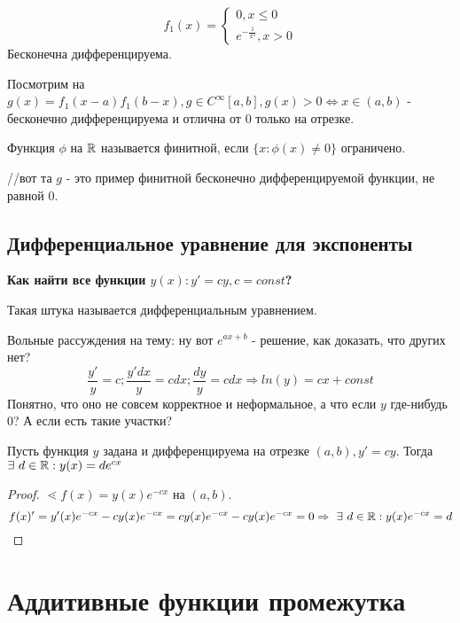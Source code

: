 \documentclass[12pt]{report}
\begin{document}
\begin{ex}[2]
$$f_1(x) = \left\{
\begin{matrix}
0, x \le 0\\
e^{-\frac{1}{x^2}}, x > 0
\end{matrix}\right.
$$
Бесконечна дифференцируема.

Посмотрим на $g(x) = f_1(x - a)f_1(b - x), g \in C^\infty[a, b], g(x) > 0 \Leftrightarrow x \in (a, b)$ - бесконечно дифференцируема и отлична от $0$ только на отрезке.
\end{ex}

\begin{defn}
Функция $\phi$ на $\mathbb{R}$ называется финитной, если $\{x: \phi(x) \neq 0\}$ ограничено.

//вот та $g$ - это пример финитной бесконечно дифференцируемой функции, не равной $0$.
\end{defn}

\section{Дифференциальное уравнение для экспоненты}

{\bfseries Как найти все функции $y(x): y' = cy, c = const$?}

Такая штука называется дифференциальным уравнением.

\begin{rem}
Вольные рассуждения на тему: ну вот $e^{ax + b}$ - решение, как доказать, что других нет?
$$\frac{y'}{y} = c; \frac{y'dx}{y} = cdx; \frac{dy}{y} = cdx \Rightarrow ln(y) = cx + const$$
Понятно, что оно не совсем корректное и неформальное, а что если $y$ где-нибудь $0$? А если есть такие участки?
\end{rem}

\begin{thm}
Пусть функция $y$ задана и дифференцируема на отрезке $(a, b), y' = cy$. Тогда $\exists ~d \in \mathbb{R}: y(x) = de^{cx}$
\end{thm}

\begin{proof}
$\lessdot f(x) = y(x)e^{-cx}$ на $(a, b)$.
$$f(x)' = y'(x)e^{-cx} - cy(x)e^{-cx} = cy(x)e^{-cx} - cy(x)e^{-cx} = 0 \Rightarrow ~\exists ~d \in \mathbb{R}: y(x)e^{-cx} = d$$
\end{proof}

\chapter{Аддитивные функции промежутка}
\end{document}
